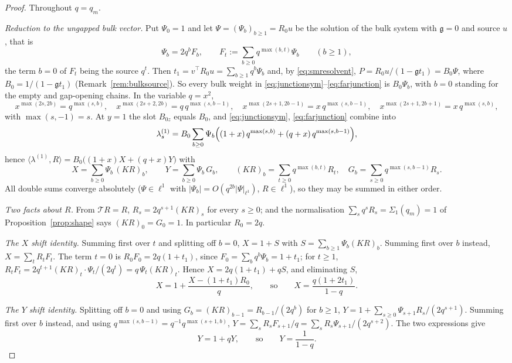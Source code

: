 \documentclass[11pt]{article}
\theoremstyle{plain}
\theoremstyle{definition}
\theoremstyle{remark}
\begin{document}
\begin{proof}
Throughout $q=q_m$.

\emph{Reduction to the ungapped bulk vector.} Put $\Psi_0=1$ and let $\Psi=(\Psi_b)_{b\ge1}=R_0u$ be
the solution of the bulk system with $\mathfrak g=0$ and source $u$, that is
\[
   \Psi_b=2q^bF_b,\qquad F_t:=\sum_{b\ge0}q^{\max(b,t)}\Psi_b\qquad(b\ge1),
\]
the term $b=0$ of $F_t$ being the source $q^t$. Then $t_1=v^{\!\top}R_0u=\sum_{b\ge1}q^b\Psi_b$ and,
by \eqref{eq:smresolvent}, $P=R_0u/(1-\mathfrak gt_1)=B_0\Psi$, where $B_0=1/(1-\mathfrak gt_1)$
(Remark~\ref{rem:bulksource}). So every bulk weight in \eqref{eq:junctionsym}--\eqref{eq:farjunction}
is $B_0\Psi_b$, with $b=0$ standing for the empty and gap-opening chains. In the variable $q=x^2$,
\[
   x^{\max(2s,2b)}=q^{\max(s,b)},\quad x^{\max(2s+2,2b)}=q\,q^{\max(s,b-1)},\quad
   x^{\max(2s+1,2b-1)}=x\,q^{\max(s,b-1)},\quad x^{\max(2s+1,2b+1)}=x\,q^{\max(s,b)},
\]
with $\max(s,-1)=s$. At $y=1$ the slot $B_{0z}$ equals $B_0$, and \eqref{eq:junctionsym},
\eqref{eq:farjunction} combine into
\begin{equation}\label{eq:lambdaPsi}
   \lambda^{(1)}_s=B_0\sum_{b\ge0}\Psi_b\Bigl((1+x)\,q^{\max(s,b)}+(q+x)\,q^{\max(s,b-1)}\Bigr),
\end{equation}
hence $\langle\lambda^{(1)},R\rangle=B_0\bigl((1+x)X+(q+x)Y\bigr)$ with
\[
   X=\sum_{b\ge0}\Psi_b\,(KR)_b,\qquad Y=\sum_{b\ge0}\Psi_b\,G_b,\qquad
   (KR)_b=\sum_{t\ge0}q^{\max(b,t)}R_t,\quad G_b=\sum_{s\ge0}q^{\max(s,b-1)}R_s .
\]
All double sums converge absolutely ($\Psi\in\ell^1$ with $|\Psi_b|=O(q^{2b}|\Psi|_{\ell^1})$,
$R\in\ell^1$), so they may be summed in either order.

\emph{Two facts about $R$.} From $\mathcal TR=R$, $R_s=2q^{s+1}(KR)_s$ for every $s\ge0$; and the
normalisation $\sum_sq^sR_s=\Sigma_1(q_m)=1$ of Proposition~\ref{prop:shape} says $(KR)_0=G_0=1$. In
particular $R_0=2q$.

\emph{The $X$ shift identity.} Summing first over $t$ and splitting off $b=0$,
$X=1+S$ with $S=\sum_{b\ge1}\Psi_b(KR)_b$. Summing first over $b$ instead, $X=\sum_tR_tF_t$. The
term $t=0$ is $R_0F_0=2q(1+t_1)$, since $F_0=\sum_bq^b\Psi_b=1+t_1$; for $t\ge1$,
$R_tF_t=2q^{t+1}(KR)_t\cdot\Psi_t/(2q^t)=q\,\Psi_t(KR)_t$. Hence $X=2q(1+t_1)+qS$, and eliminating
$S$,
\[
   X=1+\frac{X-(1+t_1)R_0}{q},\qquad\text{so}\qquad X=\frac{q(1+2t_1)}{1-q}.
\]

\emph{The $Y$ shift identity.} Splitting off $b=0$ and using $G_b=(KR)_{b-1}=R_{b-1}/(2q^b)$ for
$b\ge1$, $Y=1+\sum_{s\ge0}\Psi_{s+1}R_s/(2q^{s+1})$. Summing first over $b$ instead, and using
$q^{\max(s,b-1)}=q^{-1}q^{\max(s+1,b)}$, $Y=\sum_sR_sF_{s+1}/q=\sum_sR_s\Psi_{s+1}/(2q^{s+2})$. The
two expressions give
\[
   Y=1+qY,\qquad\text{so}\qquad Y=\frac1{1-q}.
\]


\end{proof}
\end{document}
